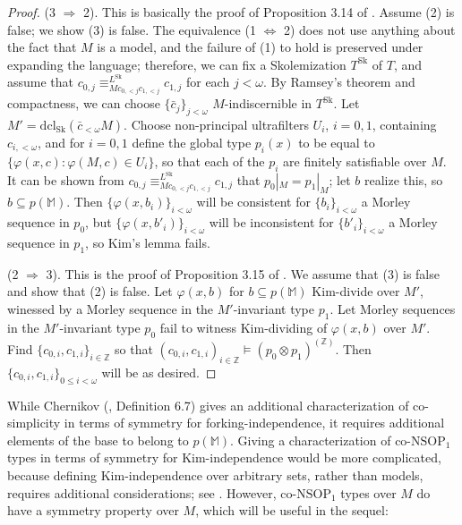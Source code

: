 \documentclass[12pt]{amsart}
\theoremstyle{definition}
\begin{document}
\begin{proof}
    (3 $\Rightarrow$ 2). This is basically the proof of Proposition 3.14 of \cite{KR17}. Assume (2) is false; we show (3) is false. The equivalence (1 $\Leftrightarrow$ 2) does not use anything about the fact that $M$ is a model, and the failure of (1) to hold is preserved under expanding the language; therefore, we can fix a Skolemization $T^{\mathrm{Sk}}$ of $T$, and assume that $c_{0, j} \equiv^{L^{\mathrm{Sk}}}_{Mc_{0, < j}c_{1, < j}} c_{1, j}$ for each $j < \omega$. By Ramsey's theorem and compactness, we can choose $\{\bar{c}_{j}\}_{j < \omega}$ $M$-indiscernible in $T^{\mathrm{Sk}}$. Let $M' = \mathrm{dcl}_{\mathrm{Sk}}(\bar{c}_{<\omega}M) $. Choose non-principal ultrafilters $U_{i}$, $i = 0, 1$, containing $c_{i,<\omega}$, and for $i = 0, 1$ define the global type $p_{i}(x)$ to be equal to $\{\varphi(x, c): \varphi(M, c) \in U_{i}\}$, so that each of the $p_{i}$ are finitely satisfiable over $M$. It can be shown from $c_{0, j} \equiv^{L^{\mathrm{Sk}}}_{Mc_{0, < j}c_{1, < j}} c_{1, j}$ that $p_{0}|_{M} = p_{1}|_{M}$; let $b$ realize this, so $b \subseteq p(\mathbb{M})$. Then $\{\varphi(x, b_{i})\}_{i <\omega}$ will be consistent for $\{b_{i}\}_{i < \omega}$ a Morley sequence in $p_{0}$, but $\{\varphi(x, b'_{i})\}_{i <\omega}$ will be inconsistent for $\{b'_{i}\}_{i < \omega}$ a Morley sequence in $p_{1}$, so Kim's lemma fails.

    (2 $\Rightarrow$ 3). This is the proof of Proposition 3.15 of \cite{KR17}. We assume that (3) is false and show that (2) is false. Let $\varphi(x, b)$ for $b \subseteq p(\mathbb{M})$ Kim-divide over $M'$, winessed by a Morley sequence in the $M'$-invariant type $p_{1}$. Let Morley sequences in the $M'$-invariant type $p_{0}$ fail to witness Kim-dividing of $\varphi(x, b)$ over $M'$. Find $\{c_{0, i}, c_{1, i}\}_{i \in \mathbb{Z}}$ so that $(c_{0, i}, c_{1, i})_{i \in \mathbb{Z}} \models (p_{0} \otimes p_{1})^{ (\mathbb{Z})}$. Then $\{c_{0, i}, c_{1, i}\}_{0\leq i < \omega }$ will be as desired.

  


    
\end{proof}


While Chernikov (\cite{Che14}, Definition 6.7) gives an additional characterization of co-simplicity in terms of symmetry for forking-independence, it requires additional elements of the base to belong to $p(\mathbb{M})$. Giving a characterization of co-$\mathrm{NSOP}_{1}$ types in terms of symmetry for Kim-independence would be more complicated, because defining Kim-independence over arbitrary sets, rather than models, requires additional considerations; see \cite{KR17}. However, co-$\mathrm{NSOP}_{1}$ types over $M$ do have a symmetry property over $M$, which will be useful in the sequel:
\end{document}
